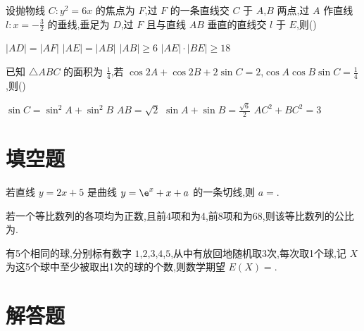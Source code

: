 \begin{problem}
设抛物线 \(C: y^2 = 6x\) 的焦点为 \(F\),过 \(F\) 的一条直线交 \(C\) 于 \(A\),\(B\) 两点,过 \(A\) 作直线 \(l: x = -\frac{3}{2}\) 的垂线,垂足为 \(D\),过 \(F\) 且与直线 \(AB\) 垂直的直线交 \(l\) 于 \(E\),则(\quad)

\choices
    {\(|AD| = |AF|\)}
    {\(|AE| = |AB|\)}
    {\(|AB| \ge 6\)}
    {\(|AE| \cdot |BE| \ge 18\)}
\end{problem}

\begin{problem}
已知 \(\triangle ABC\) 的面积为 \(\frac{1}{4}\),若 \(\cos 2A + \cos 2B + 2\sin C = 2\),\(\cos A \cos B \sin C = \frac{1}{4}\),则(\quad)

\choices
    {\(\sin C = \sin^2 A + \sin^2 B\)}
    {\(AB = \sqrt{2}\)}
    {\(\sin A + \sin B = \frac{\sqrt{6}}{2}\)}
    {\(AC^2 + BC^2 = 3\)}
\end{problem}

\section{填空题}

\begin{problem}
若直线 \(y = 2x + 5\) 是曲线 \(y = \e^x + x + a\) 的一条切线,则 \(a =\)\fillinblank{}.
\end{problem}

\begin{problem}
若一个等比数列的各项均为正数,且前4项和为4,前8项和为68,则该等比数列的公比为\fillinblank{}.
\end{problem}

\begin{problem}
有5个相同的球,分别标有数字 \(1\),\(2\),\(3\),\(4\),\(5\),从中有放回地随机取3次,每次取1个球,记 \(X\) 为这5个球中至少被取出1次的球的个数,则数学期望 \(E(X) =\)\fillinblank{}.
\end{problem}

\section{解答题}

